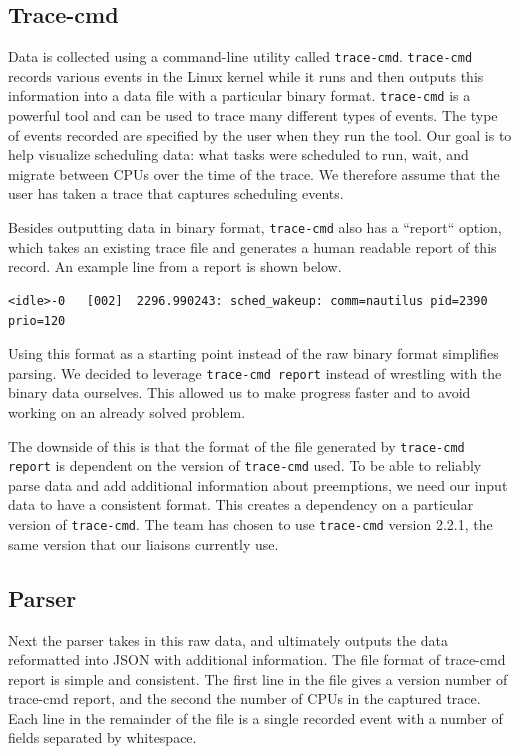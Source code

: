 \documentclass{hmcclinic}
\begin{document}
  \subsection{Trace-cmd}

  Data is collected using a command-line utility called \texttt{trace-cmd}.
  \texttt{trace-cmd} records various events in the Linux kernel while it runs and then
  outputs this information into a data file with a particular binary format.
  \texttt{trace-cmd} is a powerful tool and can be used to trace many different types of
  events. The type of events recorded are specified by the user when they run
  the tool. Our goal is to help visualize scheduling data: what tasks were
  scheduled to run, wait, and migrate between CPUs over the time of the trace.
  We therefore assume that the user has taken a trace that captures scheduling
  events.

  Besides outputting data in binary format, \texttt{trace-cmd} also has a ``report``
  option, which takes an existing trace file and generates a human readable
  report of this record. An example line from a report is shown below.
  
\footnotesize\begin{verbatim}<idle>-0   [002]  2296.990243: sched_wakeup: comm=nautilus pid=2390 prio=120\end{verbatim}

\normalsize
  Using this format as a starting point instead of the
  raw binary format simplifies parsing.  We decided to leverage
  \texttt{trace-cmd report}
  instead of wrestling with the binary data ourselves. This allowed us to make
  progress faster and to avoid working on an already solved problem.

  The downside of this is that the format of the file generated by \texttt{trace-cmd
  report} is dependent on the version of \texttt{trace-cmd} used. To be able to reliably
  parse data and add additional information about preemptions, we need our input
  data to have a consistent format. This creates a dependency on a particular
  version of \texttt{trace-cmd}. The team has chosen to use \texttt{trace-cmd} version 2.2.1, 
  the same version that our liaisons currently use.

  \subsection{Parser}
  Next the parser takes in this raw data, and ultimately outputs the data
  reformatted into JSON with additional information. The file format of
  trace-cmd report is simple and consistent. The first line in the file
  gives a version number of trace-cmd report, and the second the number of
  CPUs in the captured trace. Each line in the remainder of the file is a
  single recorded event with a number of fields separated by whitespace.
   
\end{document}

